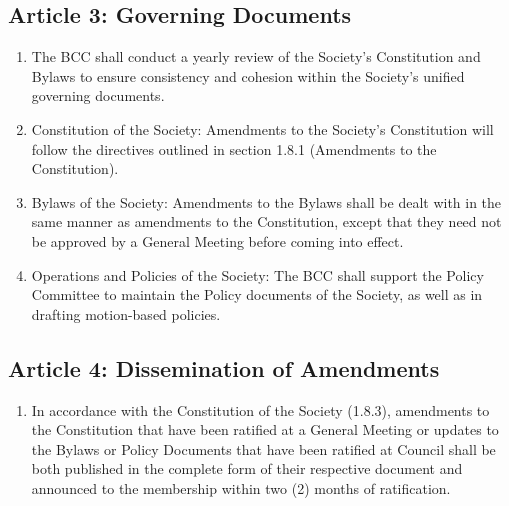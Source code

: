 \subsection{Article 3: Governing Documents}
\begin{enumerate}[label*=\arabic*., align=left]	
\item The BCC shall conduct a yearly review of the Society's Constitution and Bylaws to ensure consistency and cohesion within the Society's unified governing documents.
\item Constitution of the Society: Amendments to the Society's Constitution will follow the directives outlined in section 1.8.1 (Amendments to the Constitution).
\item Bylaws of the Society: Amendments to the Bylaws shall be dealt with in the same manner as amendments to the Constitution, except that they need not be approved by a General Meeting before coming into effect.
\item Operations and Policies of the Society: The BCC shall support the Policy Committee to maintain the Policy documents of the Society, as well as in drafting motion-based policies.
\end{enumerate}

\subsection{Article 4: Dissemination of Amendments}
\begin{enumerate}[label*=\arabic*., align=left]	
\item In accordance with the Constitution of the Society (1.8.3), amendments to the Constitution that have been ratified at a General Meeting or updates to the Bylaws or Policy Documents that have been ratified at Council shall be both published in the complete form of their respective document and announced to the membership within two (2) months of ratification.
\end{enumerate}